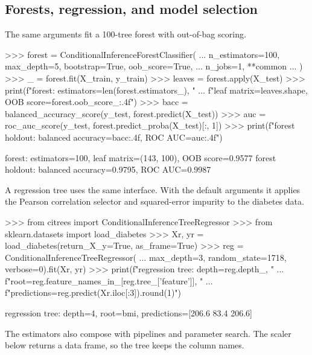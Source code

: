 \documentclass[article]{jss}
\newcommand{\sklearn}{\pkg{scikit-learn}\xspace}
\begin{document}
\subsection{Forests, regression, and model selection} \label{sec:pipelines}

The same arguments fit a 100-tree forest with out-of-bag scoring.
%
\begin{CodeChunk}
\begin{CodeInput}
>>> forest = ConditionalInferenceForestClassifier(
...     n_estimators=100, max_depth=5, bootstrap=True, oob_score=True,
...     n_jobs=1, **common
... )
>>> _ = forest.fit(X_train, y_train)
>>> leaves = forest.apply(X_test)
>>> print(f"forest: estimators={len(forest.estimators_)}, "
...       f"leaf matrix={leaves.shape}, OOB score={forest.oob_score_:.4f}")
>>> bacc = balanced_accuracy_score(y_test, forest.predict(X_test))
>>> auc = roc_auc_score(y_test, forest.predict_proba(X_test)[:, 1])
>>> print(f"forest holdout: balanced accuracy={bacc:.4f}, ROC AUC={auc:.4f}")
\end{CodeInput}
\begin{CodeOutput}
forest: estimators=100, leaf matrix=(143, 100), OOB score=0.9577
forest holdout: balanced accuracy=0.9795, ROC AUC=0.9987
\end{CodeOutput}
\end{CodeChunk}
%
A regression tree uses the same interface. With the default arguments it
applies the Pearson correlation selector and squared-error impurity to the
\sklearn diabetes data.
%
\begin{CodeChunk}
\begin{CodeInput}
>>> from citrees import ConditionalInferenceTreeRegressor
>>> from sklearn.datasets import load_diabetes
>>> Xr, yr = load_diabetes(return_X_y=True, as_frame=True)
>>> reg = ConditionalInferenceTreeRegressor(
...     max_depth=3, random_state=1718, verbose=0).fit(Xr, yr)
>>> print(f"regression tree: depth={reg.depth_}, "
...       f"root={reg.feature_names_in_[reg.tree_['feature']]}, "
...       f"predictions={reg.predict(Xr.iloc[:3]).round(1)}")
\end{CodeInput}
\begin{CodeOutput}
regression tree: depth=4, root=bmi, predictions=[206.6  83.4 206.6]
\end{CodeOutput}
\end{CodeChunk}
%
The estimators also compose with \sklearn pipelines and parameter search. The
scaler below returns a  data frame, so the tree keeps the column
names.
%
\end{document}
